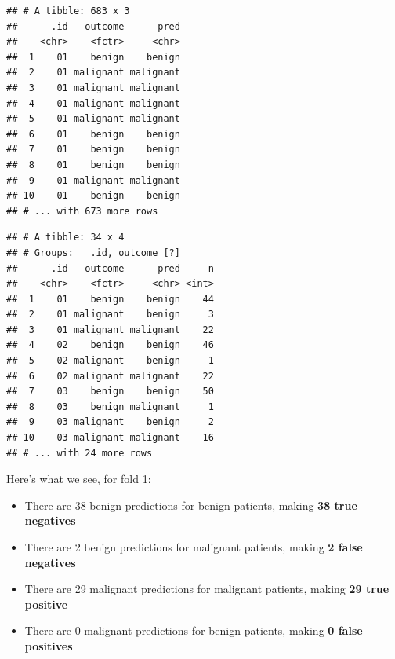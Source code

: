 \documentclass[]{article}
\newenvironment{Shaded}{\begin{snugshade}}{\end{snugshade}}
\newcommand{\KeywordTok}[1]{\textcolor[rgb]{0.13,0.29,0.53}{\textbf{#1}}}
\newcommand{\DataTypeTok}[1]{\textcolor[rgb]{0.13,0.29,0.53}{#1}}
\newcommand{\FloatTok}[1]{\textcolor[rgb]{0.00,0.00,0.81}{#1}}
\newcommand{\StringTok}[1]{\textcolor[rgb]{0.31,0.60,0.02}{#1}}
\newcommand{\OperatorTok}[1]{\textcolor[rgb]{0.81,0.36,0.00}{\textbf{#1}}}
\newcommand{\NormalTok}[1]{#1}
\providecommand{\tightlist}{%
  \setlength{\itemsep}{0pt}\setlength{\parskip}{0pt}}
\begin{document}
\begin{verbatim}
## # A tibble: 683 x 3
##      .id   outcome      pred
##    <chr>    <fctr>     <chr>
##  1    01    benign    benign
##  2    01 malignant malignant
##  3    01 malignant malignant
##  4    01 malignant malignant
##  5    01 malignant malignant
##  6    01    benign    benign
##  7    01    benign    benign
##  8    01    benign    benign
##  9    01 malignant malignant
## 10    01    benign    benign
## # ... with 673 more rows
\end{verbatim}

\begin{Shaded}
\end{Shaded}

\begin{verbatim}
## # A tibble: 34 x 4
## # Groups:   .id, outcome [?]
##      .id   outcome      pred     n
##    <chr>    <fctr>     <chr> <int>
##  1    01    benign    benign    44
##  2    01 malignant    benign     3
##  3    01 malignant malignant    22
##  4    02    benign    benign    46
##  5    02 malignant    benign     1
##  6    02 malignant malignant    22
##  7    03    benign    benign    50
##  8    03    benign malignant     1
##  9    03 malignant    benign     2
## 10    03 malignant malignant    16
## # ... with 24 more rows
\end{verbatim}

Here's what we see, for fold 1:

\begin{itemize}
\tightlist
\item
  There are 38 benign predictions for benign patients, making \textbf{38
  true negatives}
\item
  There are 2 benign predictions for malignant patients, making
  \textbf{2 false negatives}
\item
  There are 29 malignant predictions for malignant patients, making
  \textbf{29 true positive}
\item
  There are 0 malignant predictions for benign patients, making
  \textbf{0 false positives}
\end{itemize}
\end{document}
